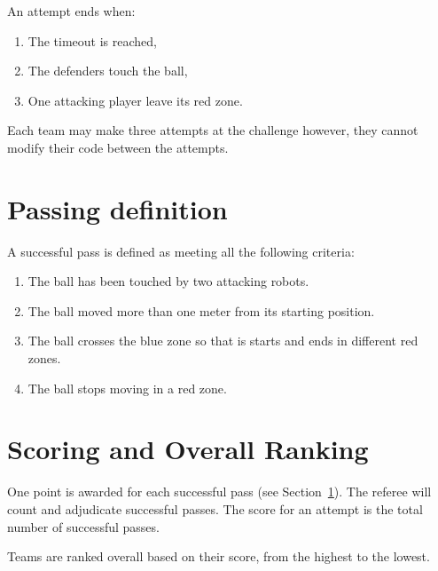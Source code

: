 \documentclass[12pt]{article}
\newcommand{\cf}{see\xspace}
\begin{document}
An attempt ends when:
\begin{enumerate}
    \item The timeout is reached,
    \item The defenders touch the ball,
    \item One attacking player leave its red zone.
\end{enumerate}

Each team may make three attempts at the challenge however, they cannot modify their code between the attempts.

\section{Passing definition}
\label{sec:pass-definition}
A successful pass is defined as meeting all the following criteria:
\begin{enumerate}
    \item The ball has been touched by two attacking robots.
    \item The ball moved more than one meter from its starting position.
    \item The ball crosses the blue zone so that is starts and ends in different red zones.
    \item The ball stops moving in a red zone.
\end{enumerate}

\section{Scoring and Overall Ranking}
One point is awarded for each successful pass (\cf Section~\ref{sec:pass-definition}). The referee will count and adjudicate successful passes.
The score for an attempt is the total number of successful passes.

Teams are ranked overall based on their score, from the highest to the lowest.
\end{document}
